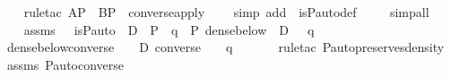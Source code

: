 \begin{isabellebody}
\ \ \isamarkupfalse%
\ {\isacharparenleft}{\kern0pt}rule{\isacharunderscore}{\kern0pt}tac\ A{\isacharequal}{\kern0pt}P\ \ B{\isacharequal}{\kern0pt}P\ \ converse{\isacharunderscore}{\kern0pt}apply{\isacharparenright}{\kern0pt}\ \ \ \isamarkupfalse%
\ {\isacharparenleft}{\kern0pt}simp\ add\ {\isacharcolon}{\kern0pt}\ is{\isacharunderscore}{\kern0pt}P{\isacharunderscore}{\kern0pt}auto{\isacharunderscore}{\kern0pt}def{\isacharparenright}{\kern0pt}\ \isanewline
\ \ \isamarkupfalse%
\ {\isacharparenleft}{\kern0pt}simp{\isacharunderscore}{\kern0pt}all{\isacharparenright}{\kern0pt}\isanewline
{}\isamarkupfalse%
\ {\isacharminus}{\kern0pt}\ \isanewline
\ \ \isamarkupfalse%
\ assms\ {\isacharcolon}{\kern0pt}\ \ {\isachardoublequoteopen}is{\isacharunderscore}{\kern0pt}P{\isacharunderscore}{\kern0pt}auto{\isacharparenleft}{\kern0pt}{\isasympi}{\isacharparenright}{\kern0pt}{\isachardoublequoteclose}\ {\isachardoublequoteopen}\ D\ {\isasymsubseteq}\ P{\isachardoublequoteclose}\ \ {\isachardoublequoteopen}q\ {\isasymin}\ P{\isachardoublequoteclose}\ {\isachardoublequoteopen}dense{\isacharunderscore}{\kern0pt}below{\isacharparenleft}{\kern0pt}{\isasympi}\ {\isacharbackquote}{\kern0pt}{\isacharbackquote}{\kern0pt}\ D{\isacharcomma}{\kern0pt}\ {\isasympi}\ {\isacharbackquote}{\kern0pt}\ q{\isacharparenright}{\kern0pt}\ {\isachardoublequoteclose}\isanewline
\ \ \isamarkupfalse%
\ {\isachardoublequoteopen}dense{\isacharunderscore}{\kern0pt}below{\isacharparenleft}{\kern0pt}converse{\isacharparenleft}{\kern0pt}{\isasympi}{\isacharparenright}{\kern0pt}\ {\isacharbackquote}{\kern0pt}{\isacharbackquote}{\kern0pt}\ {\isacharparenleft}{\kern0pt}{\isasympi}\ {\isacharbackquote}{\kern0pt}{\isacharbackquote}{\kern0pt}\ D{\isacharparenright}{\kern0pt}{\isacharcomma}{\kern0pt}\ converse{\isacharparenleft}{\kern0pt}{\isasympi}{\isacharparenright}{\kern0pt}\ {\isacharbackquote}{\kern0pt}\ {\isacharparenleft}{\kern0pt}{\isasympi}\ {\isacharbackquote}{\kern0pt}\ q{\isacharparenright}{\kern0pt}{\isacharparenright}{\kern0pt}{\isachardoublequoteclose}\ \isanewline
\ \ \ \ \isamarkupfalse%
\ {\isacharparenleft}{\kern0pt}rule{\isacharunderscore}{\kern0pt}tac\ P{\isacharunderscore}{\kern0pt}auto{\isacharunderscore}{\kern0pt}preserves{\isacharunderscore}{\kern0pt}density{\isacharparenright}{\kern0pt}\ \isamarkupfalse%
\ assms\ P{\isacharunderscore}{\kern0pt}auto{\isacharunderscore}{\kern0pt}converse\ \isamarkupfalse%

\end{isabellebody}
